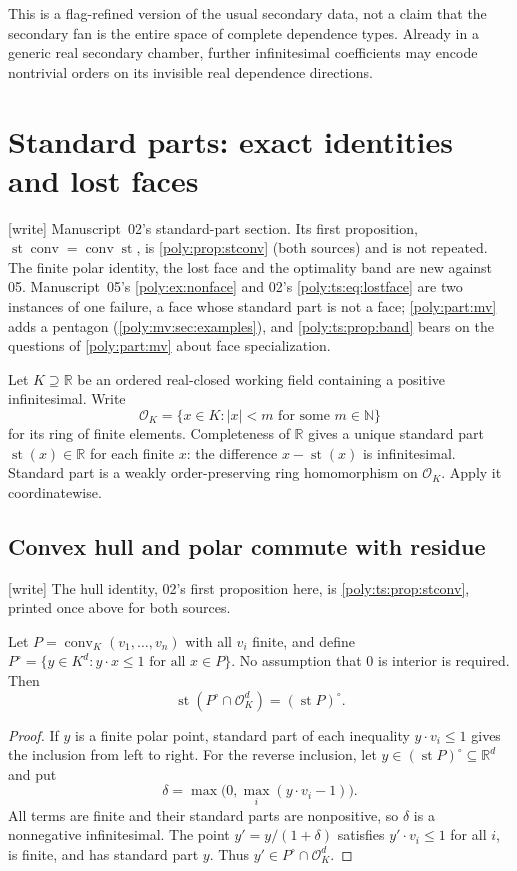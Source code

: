 \documentclass[11pt,a4paper]{article}
\numberwithin{equation}{section}
\theoremstyle{plain}
\newcommand{\wtag}{\textup{[write]}}%
\newcommand{\R}{\mathbb R}
\newcommand{\N}{\mathbb N}
\newcommand{\st}{\operatorname{st}}
\newcommand{\conv}{\operatorname{conv}}
\newcommand{\cO}{\mathcal{O}}
\begin{document}
This is a flag-refined version of the usual secondary data, not a claim
that the secondary fan is the entire space of complete dependence types.
Already in a generic real secondary chamber, further infinitesimal
coefficients may encode nontrivial orders on its invisible real dependence
directions.

\section{Standard parts: exact identities and lost faces}\label{poly:ts:sec:standardpart}
\noindent\wtag{} Manuscript~02's standard-part section. Its first
proposition, $\st\conv=\conv\st$, is \cref{poly:prop:stconv} (both sources)
and is not repeated. The finite polar identity, the lost face and the
optimality band are new against 05. Manuscript~05's \cref{poly:ex:nonface}
and 02's \eqref{poly:ts:eq:lostface} are two instances of one failure, a
face whose standard part is not a face; \cref{poly:part:mv} adds a pentagon
(\cref{poly:mv:sec:examples}), and \cref{poly:ts:prop:band} bears on the
questions of \cref{poly:part:mv} about face specialization.

Let $K\supseteq\R$ be an ordered real-closed working field containing a
positive infinitesimal. Write
\[
 \cO_K=\{x\in K:|x|<m\text{ for some }m\in\N\}
\]
for its ring of finite elements. Completeness of $\R$ gives a unique
standard part $\st(x)\in\R$ for each finite $x$: the difference
$x-\st(x)$ is infinitesimal. Standard part is a weakly order-preserving
ring homomorphism on $\cO_K$. Apply it coordinatewise.

\subsection{Convex hull and polar commute with residue}
\noindent\wtag{} The hull identity, 02's first proposition here, is
\cref{poly:ts:prop:stconv}, printed once above for both sources.

\begin{proposition}\label{poly:ts:prop:polar}
Let $P=\conv_K(v_1,\ldots,v_n)$ with all $v_i$ finite, and define
$P^\circ=\{y\in K^d:y\cdot x\le1\text{ for all }x\in P\}$.
No assumption that $0$ is interior is required. Then
\begin{equation}\label{poly:ts:eq:polar}
 \st(P^\circ\cap\cO_K^d)=(\st P)^\circ.
\end{equation}
\end{proposition}
\begin{proof}
If $y$ is a finite polar point, standard part of each inequality
$y\cdot v_i\le1$ gives the inclusion from left to right. For the reverse
inclusion, let $y\in(\st P)^\circ\subseteq\R^d$ and put
\[
 \delta=\max\bigl(0,\max_i(y\cdot v_i-1)\bigr).
\]
All terms are finite and their standard parts are nonpositive, so
$\delta$ is a nonnegative infinitesimal. The point
$y'=y/(1+\delta)$ satisfies $y'\cdot v_i\le1$ for all $i$, is finite,
and has standard part $y$. Thus $y'\in P^\circ\cap\cO_K^d$.
\end{proof}
\end{document}
